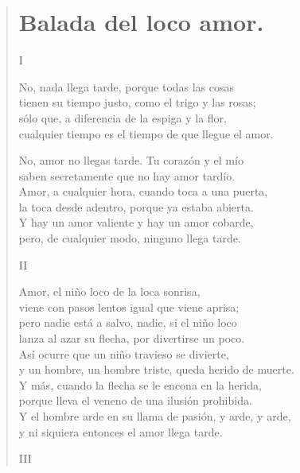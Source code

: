 \documentclass[11pt, portrait, twoside, notitlepage, openright]{book}
\begin{document}
\newpage
\begin{verse}
\begin{center}
\section{Balada del loco amor.}
\end{center}
\begin{center}
I   
\end{center}

No, nada llega tarde, porque todas las cosas\\
tienen su tiempo justo, como el trigo y las rosas;\\
sólo que, a diferencia de la espiga y la flor,\\
cualquier tiempo es el tiempo de que llegue el amor.
\newline

No, amor no llegas tarde. Tu corazón y el mío\\
saben secretamente que no hay amor tardío.\\
Amor, a cualquier hora, cuando toca a una puerta,\\
la toca desde adentro, porque ya estaba abierta.\\
Y hay un amor valiente y hay un amor cobarde,\\
pero, de cualquier modo, ninguno llega tarde.
\begin{center}
II
\end{center}

Amor, el niño loco de la loca sonrisa,\\
viene con pasos lentos igual que viene aprisa;\\
pero nadie está a salvo, nadie, si el niño loco\\
lanza al azar su flecha, por divertirse un poco.\\
Así ocurre que un niño travieso se divierte,\\
y un hombre, un hombre triste, queda herido de muerte.\\
Y más, cuando la flecha se le encona en la herida,\\
porque lleva el veneno de una ilusión prohibida.\\
Y el hombre arde en su llama de pasión, y arde, y arde,\\
y ni siquiera entonces el amor llega tarde.
\newpage
\begin{center}
III
\end{center}


\end{verse}
\end{document}
